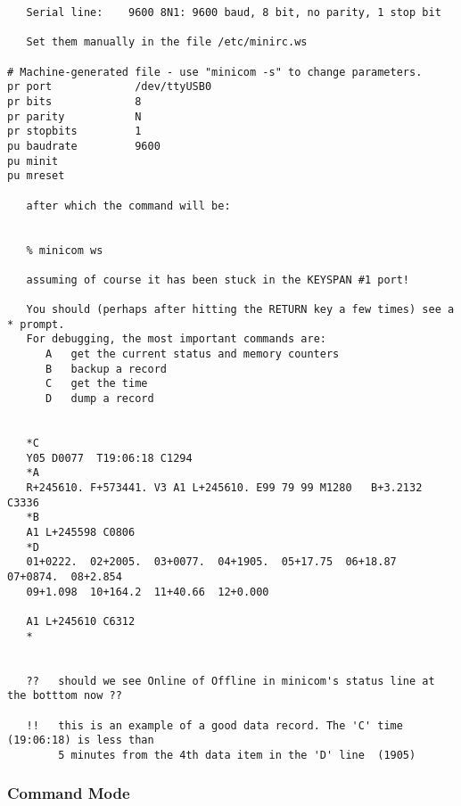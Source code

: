 \documentclass[11pt]{article}
\begin{document}
\footnotesize
\begin{verbatim}
   Serial line:    9600 8N1: 9600 baud, 8 bit, no parity, 1 stop bit

   Set them manually in the file /etc/minirc.ws

# Machine-generated file - use "minicom -s" to change parameters.
pr port             /dev/ttyUSB0
pr bits             8
pr parity           N
pr stopbits         1
pu baudrate         9600
pu minit            
pu mreset           

   after which the command will be:


   % minicom ws

   assuming of course it has been stuck in the KEYSPAN #1 port!

   You should (perhaps after hitting the RETURN key a few times) see a * prompt.
   For debugging, the most important commands are:
      A   get the current status and memory counters
      B   backup a record
      C   get the time
      D   dump a record
   

   *C
   Y05 D0077  T19:06:18 C1294
   *A
   R+245610. F+573441. V3 A1 L+245610. E99 79 99 M1280   B+3.2132 C3336
   *B
   A1 L+245598 C0806
   *D
   01+0222.  02+2005.  03+0077.  04+1905.  05+17.75  06+18.87  07+0874.  08+2.854  
   09+1.098  10+164.2  11+40.66  12+0.000                                          
                                                                                
   A1 L+245610 C6312 
   *
 

   ??   should we see Online of Offline in minicom's status line at the botttom now ??

   !!   this is an example of a good data record. The 'C' time (19:06:18) is less than
        5 minutes from the 4th data item in the 'D' line  (1905)
\end{verbatim}
\footnotesize

\subsubsection{Command Mode}
\end{document}
